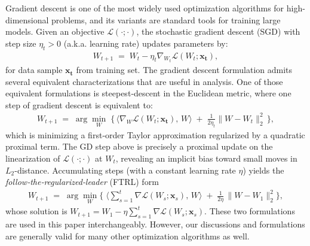 \documentclass{article}
\newcommand{\head}[1]{\vspace{1.7mm}\noindent{{\textcolor{c4}{\bf #1.}}}}
\begin{document}
\head{Gradient Descent} Gradient descent is one of the most widely used optimization algorithms for high-dimensional problems, and its variants are standard tools for training large models. Given an objective $\mathcal{L}(\cdot; \cdot)$, the stochastic gradient descent (SGD) with step size $\eta_t > 0$ (a.k.a. learning rate) updates parameters by:
\begin{align}
    W_{t+1} \;=\; W_t - \eta_t \nabla_{W_t} \mathcal{L}(W_t; \boldsymbol{x_t}),
\end{align}
for data sample $\boldsymbol{x_t}$ from training set. The gradient descent formulation admits several equivalent characterizations that are useful in analysis. One of those equivalent formulations  is steepest‑descent in the Euclidean metric, where one step of gradient descent is equivalent to:
\begin{align}
    W_{t+1} \;=\; \arg\min_{W}\;\Big\{\,
\langle \nabla_{W} \mathcal{L}(W_t; \boldsymbol{x_t}),\, W \rangle \;+\; \tfrac{1}{2\eta_t}\|W-W_t\|_2^2
\,\Big\},
\end{align}
which is  minimizing a first‑order Taylor approximation regularized by a quadratic proximal term. The  GD step above is precisely a proximal update on the linearization of $\mathcal{L}(\cdot; \cdot)$ at $W_t$, revealing an implicit bias toward small moves in $L_2$-distance. Accumulating steps (with a constant learning rate $\eta$) yields the \emph{follow‑the‑regularized‑leader} (\textsc{FTRL}) form
\begin{align}
    W_{t+1} \;=\;
\arg\min_{W} \Big\{\;\bigg\langle \sum_{s=1}^{t} \nabla \mathcal{L}(W_s; \boldsymbol{x}_s),\, W \bigg\rangle
\;+\; \frac{1}{2\eta}\,\|W-W_1\|_2^2\Big\},
\end{align}
whose solution is $W_{t+1}=W_1-\eta\sum_{s=1}^{t}\nabla \mathcal{L}(W_s; \boldsymbol{x}_s)$. These two formulations are used in this paper interchangeably. However,   our discussions and formulations are generally valid for many other optimization algorithms as well.
\end{document}
